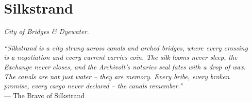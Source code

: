 \documentclass[12pt,oneside]{book}
\begin{document}
\newpage

\chapter{Silkstrand}
\emph{City of Bridges \& Dyewater.}

\noindent
\textit{``Silkstrand is a city strung across canals and arched bridges, where every crossing is a negotiation and every current carries coin. The silk looms never sleep, the Exchange never closes, and the Archivolt's notaries seal fates with a drop of wax. The canals are not just water -- they are memory. Every bribe, every broken promise, every cargo never declared -- the canals remember.''} \\
--- The Bravo of Silkstrand

\vspace{1em}
\end{document}
